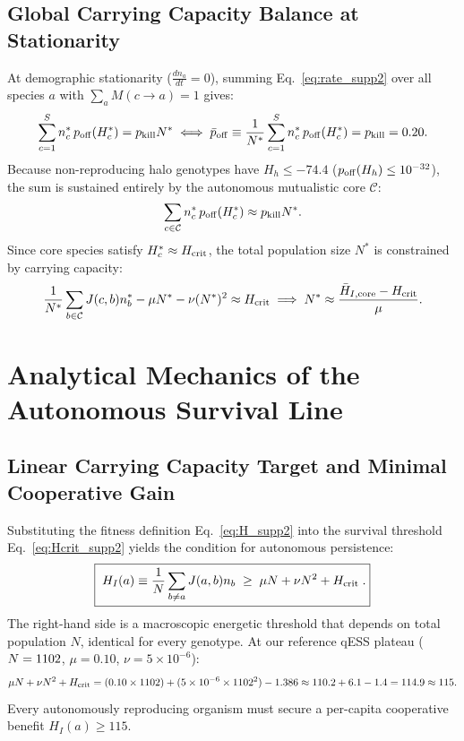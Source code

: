 \documentclass[11pt,a4paper]{article}
\newcommand{\pk}{p_{\rm kill}}
\newcommand{\poff}{p_{\rm off}}
\newcommand{\Hc}{H_{\rm crit}}
\begin{document}
\subsection{Global Carrying Capacity Balance at Stationarity}

At demographic stationarity ($\frac{dn_a}{dt} = 0$), summing Eq.~\eqref{eq:rate_supp2} over all species $a$ with $\sum_a M(c \to a) = 1$ gives:
\begin{equation}
\sum_{c=1}^S n_c^* \, \poff(H_c^*) = \pk N^* \iff \bar{p}_{\mathrm{off}} \equiv \frac{1}{N^*} \sum_{c=1}^S n_c^* \, \poff(H_c^*) = \pk = 0.20.
\label{eq:poff_balance_supp2}
\end{equation}
Because non-reproducing halo genotypes have $H_h \le -74.4$ ($\poff(H_h) \le 10^{-32}$), the sum is sustained entirely by the autonomous mutualistic core $\mathcal{C}$:
\begin{equation}
\sum_{c \in \mathcal{C}} n_c^* \, \poff(H_c^*) \approx \pk N^*.
\end{equation}
Since core species satisfy $H_c^* \approx \Hc$, the total population size $N^*$ is constrained by carrying capacity:
\begin{equation}
\frac{1}{N^*} \sum_{b \in \mathcal{C}} J(c,b) n_b^* - \mu N^* - \nu (N^*)^2 \approx \Hc \implies N^* \approx \frac{\bar{H}_{I,\mathrm{core}} - \Hc}{\mu}.
\label{eq:Nstar_scaling}
\end{equation}

\section{Analytical Mechanics of the Autonomous Survival Line}
\label{sec:line}

\subsection{Linear Carrying Capacity Target and Minimal Cooperative Gain}

Substituting the fitness definition Eq.~\eqref{eq:H_supp2} into the survival threshold Eq.~\eqref{eq:Hcrit_supp2} yields the condition for autonomous persistence:
\begin{equation}
\boxed{\;H_I(a) \equiv \frac{1}{N} \sum_{b \neq a} J(a,b) n_b \;\ge\; \mu N + \nu N^2 + \Hc\;.}
\label{eq:survival_line}
\end{equation}
The right-hand side is a macroscopic energetic threshold that depends on total population $N$, identical for every genotype. At our reference qESS plateau ($N = 1102$, $\mu = 0.10$, $\nu = 5 \times 10^{-6}$):
\begin{equation}
\mu N + \nu N^2 + \Hc = (0.10 \times 1102) + (5 \times 10^{-6} \times 1102^2) - 1.386 \approx 110.2 + 6.1 - 1.4 = 114.9 \approx 115.
\end{equation}
Every autonomously reproducing organism must secure a per-capita cooperative benefit $H_I(a) \ge 115$.
\end{document}
